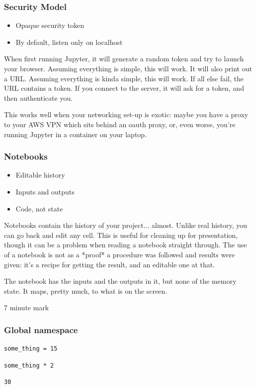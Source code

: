 \begin{frame}
\frametitle{Security Model}

\begin{itemize}
\item Opaque security token
\item By default, listen only on localhost
\end{itemize}

\end{frame}

When first running Jupyter,
it will generate a random token and try to launch your browser.
Assuming everything is simple, this will work.
It will also print out a URL.
Assuming everything is kinda simple, this will work.
If all else fail,
the URL contains a token.
If you connect to the server,
it will ask for a token,
and then authenticate you.

This works well when your networking set-up is exotic:
maybe you have a proxy to your AWS VPN which sits behind an oauth proxy,
or,
even worse,
you're running Jupyter in a container on your laptop.

\begin{frame}
\frametitle{Notebooks}

\begin{itemize}
\item Editable history
\item Inputs and outputs
\item Code, not state
\end{itemize}

\end{frame}

Notebooks contain the history of your project...
almost.
Unlike real history,
you can go back and edit any cell.
This is useful for cleaning up for presentation,
though it can be a problem when reading a notebook straight through.
The use of a notebook is not as a *proof* a procedure
was followed and results were given:
it's a recipe for getting the result,
and an editable one at that.

The notebook has the inputs and the outputs in it,
but none of the memory state.
It maps,
pretty much,
to what is on the screen.

7 minute mark

\begin{frame}[fragile]
\frametitle{Global namespace}

\begin{lstlisting}[frame=single]
some_thing = 15
\end{lstlisting}

\begin{lstlisting}[frame=single]
some_thing * 2
\end{lstlisting}

\begin{lstlisting}[frame=single]
30
\end{lstlisting}

\end{frame}

